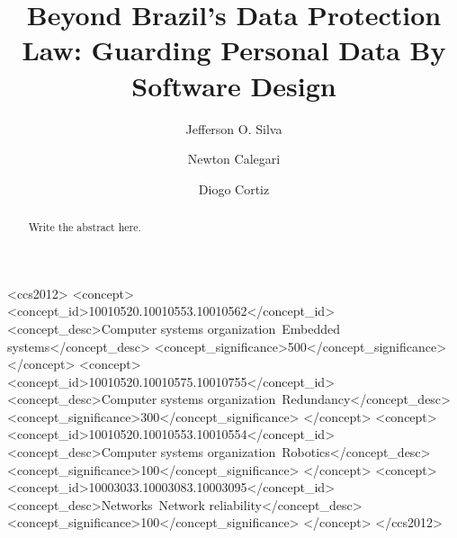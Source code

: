 \documentclass[sigconf]{acmart}
\begin{document}
%
\title{Beyond Brazil's Data Protection Law: Guarding Personal Data By Software Design}

%
\author{Jefferson O. Silva}

\author{Newton Calegari}

\author{Diogo Cortiz}

%
\renewcommand{\shortauthors}{Silva et al.}

%
\begin{abstract}
Write the abstract here.

\end{abstract}

%
%
\begin{CCSXML}
<ccs2012>
 <concept>
  <concept_id>10010520.10010553.10010562</concept_id>
  <concept_desc>Computer systems organization~Embedded systems</concept_desc>
  <concept_significance>500</concept_significance>
 </concept>
 <concept>
  <concept_id>10010520.10010575.10010755</concept_id>
  <concept_desc>Computer systems organization~Redundancy</concept_desc>
  <concept_significance>300</concept_significance>
 </concept>
 <concept>
  <concept_id>10010520.10010553.10010554</concept_id>
  <concept_desc>Computer systems organization~Robotics</concept_desc>
  <concept_significance>100</concept_significance>
 </concept>
 <concept>
  <concept_id>10003033.10003083.10003095</concept_id>
  <concept_desc>Networks~Network reliability</concept_desc>
  <concept_significance>100</concept_significance>
 </concept>
</ccs2012>
\end{CCSXML}
\end{document}
